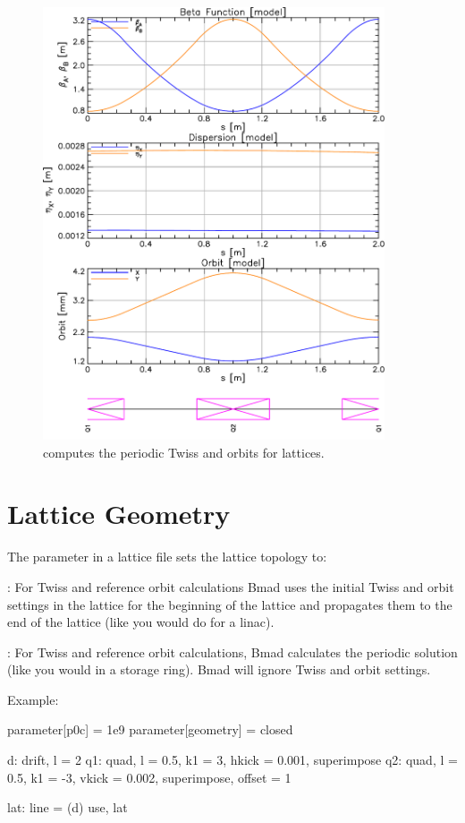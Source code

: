 \documentclass{hitec}
\newcommand{\Section}[1]{\section{#1}\vspace*{-1ex}}
\begin{document}
\begin{figure}[tb]
  \centering
  \includegraphics[width=0.9\textwidth]{geometry.pdf}
  \caption{\bmad computes the periodic Twiss and orbits for  lattices.}
  \label{f:geometry}
\end{figure}

\Section{Lattice Geometry}

The  parameter in a lattice file sets the lattice topology to:
\begin{description}
\item {}: For Twiss and reference orbit calculations Bmad uses the initial Twiss 
and orbit settings in the lattice for the beginning of the lattice and
propagates them to the end of the lattice (like you would do for a linac). 
\item {}: For Twiss and reference orbit calculations, Bmad calculates the 
periodic solution (like you would in a storage ring). 
Bmad will ignore Twiss and orbit settings.
\end{description}

Example:
\begin{code}
parameter[p0c] = 1e9
parameter[geometry] = closed

d: drift, l = 2
q1: quad, l = 0.5, k1 = 3, hkick = 0.001, superimpose
q2: quad, l = 0.5, k1 = -3, vkick = 0.002, superimpose, offset = 1

lat: line = (d)
use, lat
\end{code}
\end{document}
